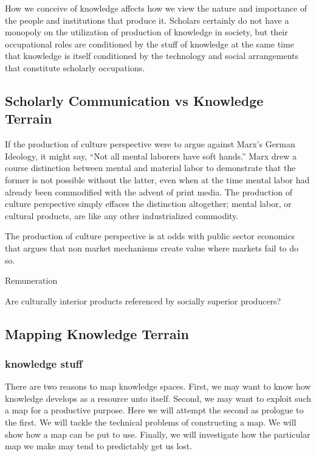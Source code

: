 \documentclass[]{book}
\theoremstyle{definition}
\theoremstyle{definition}
\theoremstyle{definition}
\theoremstyle{remark}
\begin{document}
How we conceive of knowledge affects how we view the nature and
importance of the people and institutions that produce it. Scholars
certainly do not have a monopoly on the utilization of production of
knowledge in society, but their occupational roles are conditioned by
the stuff of knowledge at the same time that knowledge is itself
conditioned by the technology and social arrangements that constitute
scholarly occupations.

\hypertarget{scholarly-communication-vs-knowledge-terrain}{%
\subsection{Scholarly Communication vs Knowledge
Terrain}\label{scholarly-communication-vs-knowledge-terrain}}

If the production of culture perspective were to argue against Marx's
German Ideology, it might say, ``Not all mental laborers have soft
hands.'' Marx drew a course distinction between mental and material
labor to demonstrate that the former is not possible without the latter,
even when at the time mental labor had already been commodified with the
advent of print media. The production of culture perspective simply
effaces the distinction altogether; mental labor, or cultural products,
are like any other industrialized commodity.

The production of culture perspective is at odds with public sector
economics that argues that non market mechanisms create value where
markets fail to do so. \citep{Hayes2000Assessing}

Remuneration

Are culturally interior products referenced by socially superior
producers?

\hypertarget{wok}{%
\subsection{Mapping Knowledge Terrain}\label{wok}}

\hypertarget{knowledge-stuff}{%
\subsubsection{knowledge stuff}\label{knowledge-stuff}}

There are two reasons to map knowledge spaces. First, we may want to
know how knowledge develops as a resource unto itself. Second, we may
want to exploit such a map for a productive purpose. Here we will
attempt the second as prologue to the first. We will tackle the
technical problems of constructing a map. We will show how a map can be
put to use. Finally, we will investigate how the particular map we make
may tend to predictably get us lost.
\end{document}
